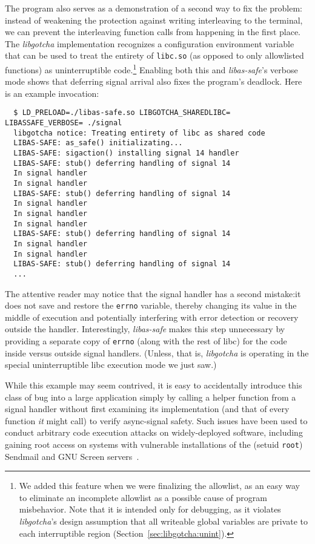 The program also serves as a demonstration of a second way to fix the problem:\@
instead of weakening the protection against writing interleaving to the terminal, we
can prevent the interleaving function calls from happening in the first place.  The
\textit{libgotcha} implementation recognizes a configuration environment variable
that can be used to treat the entirety of \texttt{libc.so} (as opposed to only
allowlisted functions) as uninterruptible code.\footnote{We added this feature when
we were finalizing the allowlist, as an easy way to eliminate an incomplete allowlist
as a possible cause of program misbehavior.  Note that it is intended only for
debugging, as it violates \textit{libgotcha}'s design assumption that all writeable
global variables are private to each interruptible region
(Section~\ref{sec:libgotcha:unint}).}  Enabling both this and
\textit{libas-safe}'s verbose mode shows that deferring signal arrival also fixes the
program's deadlock.  Here is an example invocation:
\begin{lstlisting}
  $ LD_PRELOAD=./libas-safe.so LIBGOTCHA_SHAREDLIBC= LIBASSAFE_VERBOSE= ./signal
  libgotcha notice: Treating entirety of libc as shared code
  LIBAS-SAFE: as_safe() initializating...
  LIBAS-SAFE: sigaction() installing signal 14 handler
  LIBAS-SAFE: stub() deferring handling of signal 14
  In signal handler
  In signal handler
  LIBAS-SAFE: stub() deferring handling of signal 14
  In signal handler
  In signal handler
  In signal handler
  LIBAS-SAFE: stub() deferring handling of signal 14
  In signal handler
  In signal handler
  LIBAS-SAFE: stub() deferring handling of signal 14
  ...
\end{lstlisting}

The attentive reader may notice that the signal handler has a second mistake:\@ it
does not save and restore the \texttt{errno} variable, thereby changing its value in
the middle of execution and potentially interfering with error detection or recovery
outside the handler.  Interestingly, \textit{libas-safe} makes this step unnecessary
by providing a separate copy of \texttt{errno} (along with the rest of libc) for the
code inside versus outside signal handlers.  (Unless, that is, \textit{libgotcha} is
operating in the special uninterruptible libc execution mode we just saw.)

While this example may seem contrived, it is easy to accidentally introduce this
class of bug into a large application simply by calling a helper function from a
signal handler without first examining its implementation (and that of every function
\textit{it} might call) to verify async-signal safety.  Such issues have been used to
conduct arbitrary code execution attacks on widely-deployed software, including
gaining root access on systems with vulnerable installations of the (setuid
\texttt{root}) Sendmail and GNU Screen servers~\cite{www-signals-fun-profit}.



